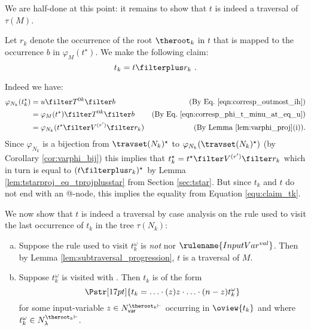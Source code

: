 \begin{itemize}[$\bullet$]
{\begin{enumerate}
\begin{itemize}
        We are half-done at this point: it remains to show that $t$ is indeed a traversal of $\tau(M)$.

        Let $r_k$ denote the occurrence of the root
        $\theroot_k$ in $t$ that is mapped to the
        occurrence $b$ in $\varphi_{M}(t^\star)$. We make the following claim:
        \begin{equation}
            t_k = t \filterplus r_k \ . \label{equ:claim_tk}
        \end{equation}

        Indeed we have:
        \begin{align*}
        \varphi_{N_k}(t_k^\star) &= u \filter T^{0k}\filter b
            & \mbox{(By Eq.\ \ref{eqn:corresp_outmost_ih})} \\
         &= \varphi_{M}(t^\star) \filter T^{0k}\filter b
            & \mbox{(By Eq.\ \ref{eqn:corresp_phi_t_minu_at_eq_u})} \\
         &= \varphi_{N_k}(t^\star \filter V^{(r')} \filter r_k )
            & \mbox{(By Lemma \ref{lem:varphi_proj}(i)).}
        \end{align*}
        Since $\varphi_{N_k}$ is a bijection from  $\travset(N_k)^\star$ to $\varphi_{N_k}(\travset(N_k)^\star )$ (by Corollary \ref{cor:varphi_bij}) this implies that  $t_k^\star = t^\star \filter V^{(r')} \filter r_k$ which in turn is equal to $(t\filterplus r_k)^\star$ by Lemma \ref{lem:tstarproj_eq_tprojplusstar} from Section \ref{sec:tstar}. But since $t_k$ and $t$ do not end with an @-node, this implies the equality from Equation \ref{equ:claim_tk}.
    \smallskip

    We now show that $t$ is indeed a traversal by case analysis on the rule used to visit the last occurrence of $t_k$ in the tree $\tau(N_k)$:
    \begin{enumerate}[(a)]
    \item  Suppose the rule used to visit $t_k^\omega$ is \emph{not}  nor $\rulename{InputVar^{val}}$.
        Then by Lemma \ref{lem:subtraversal_progression}, $t$ is a traversal of $M$.

    \item Suppose $t_k^\omega$ is visited with . Then $t_k$ is of the form
        $$\Pstr[17pt]{ t_k = \ldots \cdot (z)z \cdot \ldots \cdot (n-z){t_k^\omega}}$$
        for some input-variable $z \in
        N^{\theroot_k\vdash}_{\sf var}$ occurring in
        $\oview{t_k}$ and where $t_k^\omega \in N_\lambda^{\theroot_k\vdash}$.



\end{enumerate}
\end{itemize}
\end{enumerate}}
\end{itemize}
